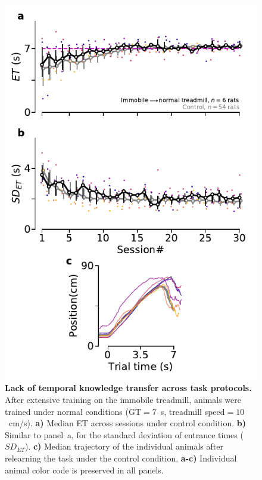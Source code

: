 \begin{figure}[!h]
  \begin{center}
    \includegraphics[scale=1]{ch-appendicies/figures/Imm2CtrlTrd.pdf}
    \caption[Immobile Animals Relearning the Task]
    {\textbf{Lack of temporal knowledge transfer across task protocols.}
    After extensive training on the immobile treadmill, animals were trained under normal conditions (GT$=7$~s, treadmill speed$=10$~cm/s).
    \textbf{a)}
    Median ET across sessions under control condition.
    \textbf{b)}
    Similar to panel~a, for the standard deviation of entrance times ($SD_{ET}$).
    \textbf{c)}
    Median trajectory of the individual animals after relearning the task under the control condition.
    \textbf{a-c)}
    Individual animal color code is preserved in all panels.
    }
    \label{fig:appendix:Imm2Ctrl}
  \end{center}
\end{figure}